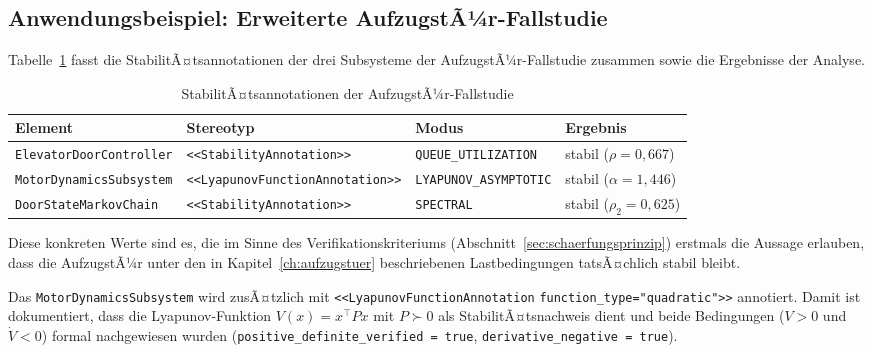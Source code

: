 ﻿\documentclass[a4paper,12pt]{report}
\theoremstyle{definition}
\begin{document}
\subsection{Anwendungsbeispiel: Erweiterte AufzugstÃ¼r-Fallstudie}

Tabelle~\ref{tab:elevator-stability} fasst die StabilitÃ¤tsannotationen der
drei Subsysteme der AufzugstÃ¼r-Fallstudie zusammen sowie die Ergebnisse der
Analyse.

\begin{table}
	\centering
	\begin{tabular}{@{}llll@{}}
		\toprule
		\textbf{Element} & \textbf{Stereotyp} & \textbf{Modus}
		& \textbf{Ergebnis} \\
		\midrule
		\texttt{ElevatorDoor}\newline\texttt{Controller}
		& \texttt{<<Stability}\newline\texttt{Annotation>>}
		& \texttt{QUEUE\_}\newline\texttt{UTILIZATION}
		& stabil ($\rho = 0{,}667$) \\[6pt]
		\texttt{MotorDynamics}\newline\texttt{Subsystem}
		& \texttt{<<Lyapunov}\newline\texttt{FunctionAnnotation>>}
		& \texttt{LYAPUNOV\_}\newline\texttt{ASYMPTOTIC}
		& stabil ($\alpha = 1{,}446$) \\[6pt]
		\texttt{DoorState}\newline\texttt{MarkovChain}
		& \texttt{<<Stability}\newline\texttt{Annotation>>}
		& \texttt{SPECTRAL}
		& stabil ($\rho_2 = 0{,}625$) \\
		\bottomrule
	\end{tabular}
	\caption{StabilitÃ¤tsannotationen der AufzugstÃ¼r-Fallstudie}
\label{tab:eq-vs-stab}
	\label{tab:elevator-stability}
\end{table}

Diese konkreten Werte sind es, die im Sinne des Verifikationskriteriums (Abschnitt~\ref{sec:schaerfungsprinzip}) erstmals die Aussage erlauben, dass die AufzugstÃ¼r unter den in Kapitel~\ref{ch:aufzugstuer} beschriebenen Lastbedingungen tatsÃ¤chlich stabil bleibt.

Das \texttt{MotorDynamicsSubsystem} wird zusÃ¤tzlich mit
\texttt{<<LyapunovFunctionAnno\newline tation} \texttt{function\_type="quadratic">>}
annotiert. Damit ist dokumentiert, dass die Lyapunov-Funktion
$V(x) = x^\top P x$ mit $P \succ 0$ als StabilitÃ¤tsnachweis dient und
beide Bedingungen ($V > 0$ und $\dot{V} < 0$) formal nachgewiesen wurden
(\texttt{positive\_definite\_veri\newline fied = true},
\texttt{derivative\_negative = true}).
\end{document}
